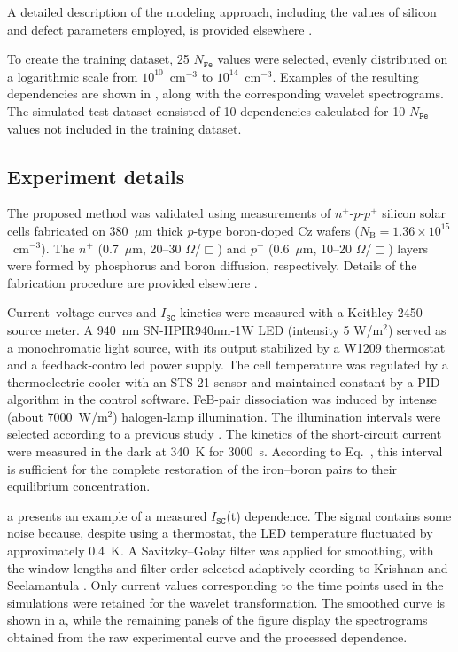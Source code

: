 \documentclass[10pt]{iopart}
\begin{document}
A detailed description of the modeling approach, including the values of silicon and defect parameters employed, is provided elsewhere \cite{Olikh2025MSEB, Olikh2019SM}.

To create the training dataset, 25 $N_\mathtt{Fe}$ values were selected, evenly distributed on a logarithmic scale from $10^{10}$~cm$^{-3}$ to $10^{14}$~cm$^{-3}$.
Examples of the resulting dependencies are shown in , along with the corresponding wavelet spectrograms.
The simulated test dataset consisted of 10 dependencies calculated for 10 $N_\mathtt{Fe}$ values not included in the training dataset.



\subsection{Experiment details}\label{subsec:ExpDet}

The proposed method was validated using measurements of $n^+$-$p$-$p^+$ silicon solar cells fabricated on 
380~$\mu$m thick $p$-type boron-doped Cz wafers ($N_\mathrm{B}=1.36\times10^{15}$~cm$^{-3}$).
The $n^+$ (0.7~$\mu$m, 20–30 $\Omega$/$\Box$) and $p^+$ (0.6~$\mu$m, 10–20 $\Omega$/$\Box$)
layers were formed by phosphorus and boron diffusion, respectively.
Details of the fabrication procedure are provided elsewhere \cite{Olikh2021JAP}.

Current–voltage curves and $I_\mathtt{SC}$ kinetics were measured with a Keithley 2450 source meter. 
A 940~nm SN-HPIR940nm-1W LED (intensity 5 W/m$^{2}$) served as a monochromatic light source, 
with its output stabilized by a W1209 thermostat and a feedback-controlled power supply.
The cell temperature was regulated by a thermoelectric cooler with an STS-21 sensor and maintained constant by a PID algorithm in the control software.
FeB-pair dissociation was induced by intense (about 7000~W/m$^{2}$) halogen-lamp illumination.
The illumination intervals were selected according to a previous study \cite{OlikhPSSA}.
The kinetics of the short-circuit current were measured in the dark at 340~K for 3000~s. 
According to Eq.~, this interval is sufficient for the complete restoration of the iron–boron pairs to their equilibrium concentration.


a presents an example of a measured $I_\mathtt{SC}$(t) dependence.
The signal contains some noise because, despite using a thermostat, the LED temperature fluctuated by approximately 0.4~K.
A Savitzky–Golay filter was applied for smoothing, with the window lengths and filter order selected adaptively ccording to Krishnan and Seelamantula \cite{Krishnan2013}.
Only current values corresponding to the time points used in the simulations were retained for the wavelet transformation.
The smoothed curve is shown in a, 
while the remaining panels of the figure display the spectrograms obtained from the raw experimental curve and the processed dependence.
\end{document}
